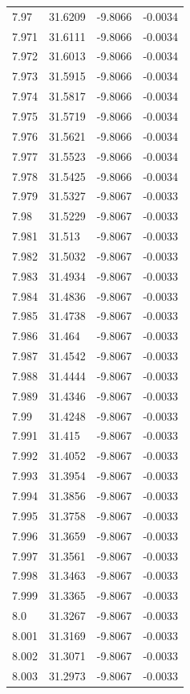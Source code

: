 \begin{tabular}{llll}
7.97 & 31.6209 & -9.8066 & -0.0034 \\
7.971 & 31.6111 & -9.8066 & -0.0034 \\
7.972 & 31.6013 & -9.8066 & -0.0034 \\
7.973 & 31.5915 & -9.8066 & -0.0034 \\
7.974 & 31.5817 & -9.8066 & -0.0034 \\
7.975 & 31.5719 & -9.8066 & -0.0034 \\
7.976 & 31.5621 & -9.8066 & -0.0034 \\
7.977 & 31.5523 & -9.8066 & -0.0034 \\
7.978 & 31.5425 & -9.8066 & -0.0034 \\
7.979 & 31.5327 & -9.8067 & -0.0033 \\
7.98 & 31.5229 & -9.8067 & -0.0033 \\
7.981 & 31.513 & -9.8067 & -0.0033 \\
7.982 & 31.5032 & -9.8067 & -0.0033 \\
7.983 & 31.4934 & -9.8067 & -0.0033 \\
7.984 & 31.4836 & -9.8067 & -0.0033 \\
7.985 & 31.4738 & -9.8067 & -0.0033 \\
7.986 & 31.464 & -9.8067 & -0.0033 \\
7.987 & 31.4542 & -9.8067 & -0.0033 \\
7.988 & 31.4444 & -9.8067 & -0.0033 \\
7.989 & 31.4346 & -9.8067 & -0.0033 \\
7.99 & 31.4248 & -9.8067 & -0.0033 \\
7.991 & 31.415 & -9.8067 & -0.0033 \\
7.992 & 31.4052 & -9.8067 & -0.0033 \\
7.993 & 31.3954 & -9.8067 & -0.0033 \\
7.994 & 31.3856 & -9.8067 & -0.0033 \\
7.995 & 31.3758 & -9.8067 & -0.0033 \\
7.996 & 31.3659 & -9.8067 & -0.0033 \\
7.997 & 31.3561 & -9.8067 & -0.0033 \\
7.998 & 31.3463 & -9.8067 & -0.0033 \\
7.999 & 31.3365 & -9.8067 & -0.0033 \\
8.0 & 31.3267 & -9.8067 & -0.0033 \\
8.001 & 31.3169 & -9.8067 & -0.0033 \\
8.002 & 31.3071 & -9.8067 & -0.0033 \\
8.003 & 31.2973 & -9.8067 & -0.0033 \\

\end{tabular}
